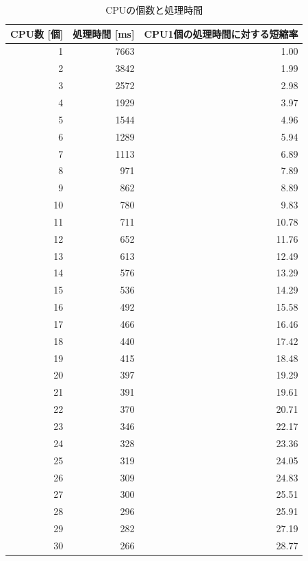 \documentclass[a4j,titlepage]{jsarticle}
\newcommand{\chuo}[1]{\multicolumn{1}{|c|}{#1}}
\begin{document}
\begin{table}[htbp]
  \centering
  \caption{CPUの個数と処理時間}
  \label{tb:kadai2}

  \begin{tabular}{|r|r|r|}
    \hline
    \chuo{CPU数 [個]} & \chuo{処理時間 [ms]} & \chuo{CPU1個の処理時間に対する短縮率} \\ \hline \hline
     1 & 7663 &  1.00 \\ \hline
     2 & 3842 &  1.99 \\ \hline
     3 & 2572 &  2.98 \\ \hline
     4 & 1929 &  3.97 \\ \hline
     5 & 1544 &  4.96 \\ \hline
     6 & 1289 &  5.94 \\ \hline
     7 & 1113 &  6.89 \\ \hline
     8 &  971 &  7.89 \\ \hline
     9 &  862 &  8.89 \\ \hline
    10 &  780 &  9.83 \\ \hline
    11 &  711 & 10.78 \\ \hline
    12 &  652 & 11.76 \\ \hline
    13 &  613 & 12.49 \\ \hline
    14 &  576 & 13.29 \\ \hline
    15 &  536 & 14.29 \\ \hline
    16 &  492 & 15.58 \\ \hline
    17 &  466 & 16.46 \\ \hline
    18 &  440 & 17.42 \\ \hline
    19 &  415 & 18.48 \\ \hline
    20 &  397 & 19.29 \\ \hline
    21 &  391 & 19.61 \\ \hline
    22 &  370 & 20.71 \\ \hline
    23 &  346 & 22.17 \\ \hline
    24 &  328 & 23.36 \\ \hline
    25 &  319 & 24.05 \\ \hline
    26 &  309 & 24.83 \\ \hline
    27 &  300 & 25.51 \\ \hline
    28 &  296 & 25.91 \\ \hline
    29 &  282 & 27.19 \\ \hline
    30 &  266 & 28.77 \\ \hline
  \end{tabular}
\end{table}
\end{document}
